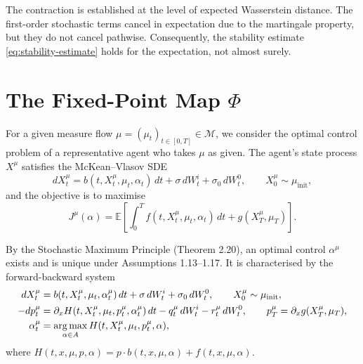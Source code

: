 \begin{remark}
\label{rem:expectation-vs-pathwise}
The contraction is established at the level of expected Wasserstein distance. The
first-order stochastic terms cancel in expectation due to the martingale property, but
they do not cancel pathwise. Consequently, the stability estimate
\eqref{eq:stability-estimate} holds for the expectation, not almost surely.
\end{remark}


\section{The Fixed-Point Map $\Phi$}
\label{sec:wp-fixed-point}

For a given measure flow $\mu = (\mu_t)_{t \in [0,T]} \in \mathcal{M}$, we consider the
optimal control problem of a representative agent who takes $\mu$ as given. The agent's
state process $X^\mu$ satisfies the McKean--Vlasov SDE
\begin{equation}
    dX_t^\mu = b(t, X_t^\mu, \mu_t, \alpha_t)\, dt + \sigma\, dW_t^i + \sigma_0\, dW_t^0,
    \qquad X_0^\mu \sim \mu_{\mathrm{init}},
    \label{eq:agent-sde}
\end{equation}
and the objective is to maximise
\begin{equation}
    J^\mu(\alpha) = \mathbb{E}\left[ \int_0^T f(t, X_t^\mu, \mu_t, \alpha_t)\, dt +
    g(X_T^\mu, \mu_T) \right].
    \label{eq:agent-objective}
\end{equation}

By the Stochastic Maximum Principle (Theorem 2.20), an optimal control $\alpha^\mu$
exists and is unique under Assumptions 1.13--1.17. It is characterised by the
forward-backward system
\begin{align}
    dX_t^\mu &= b(t, X_t^\mu, \mu_t, \alpha_t^\mu)\, dt + \sigma\, dW_t^i +
        \sigma_0\, dW_t^0, \qquad X_0^\mu \sim \mu_{\mathrm{init}}, \notag \\
    -dp_t^\mu &= \partial_x H(t, X_t^\mu, \mu_t, p_t^\mu, \alpha_t^\mu)\, dt -
        q_t^\mu\, dW_t^i - r_t^\mu\, dW_t^0, \qquad p_T^\mu = \partial_x g(X_T^\mu,
        \mu_T), \label{eq:agent-fbsde} \\
    \alpha_t^\mu &= \operatorname*{arg\,max}_{\alpha \in A} H(t, X_t^\mu, \mu_t, p_t^\mu, \alpha), \notag
\end{align}
where $H(t,x,\mu,p,\alpha) = p \cdot b(t,x,\mu,\alpha) + f(t,x,\mu,\alpha)$.

